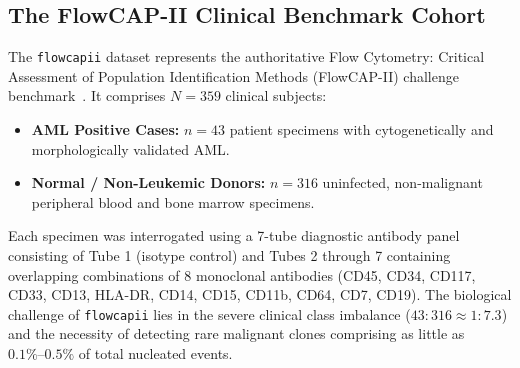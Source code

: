 \documentclass[10pt,journal,compsoc]{IEEEtran}
\begin{document}
\subsection{The FlowCAP-II Clinical Benchmark Cohort}
The \texttt{flowcapii} dataset represents the authoritative Flow Cytometry: Critical Assessment of Population Identification Methods (FlowCAP-II) challenge benchmark~\cite{aghaeepour2013critical}. It comprises $N=359$ clinical subjects:
\begin{itemize}
    \item \textbf{AML Positive Cases:} $n=43$ patient specimens with cytogenetically and morphologically validated AML.
    \item \textbf{Normal / Non-Leukemic Donors:} $n=316$ uninfected, non-malignant peripheral blood and bone marrow specimens.
\end{itemize}
Each specimen was interrogated using a 7-tube diagnostic antibody panel consisting of Tube 1 (isotype control) and Tubes 2 through 7 containing overlapping combinations of 8 monoclonal antibodies (CD45, CD34, CD117, CD33, CD13, HLA-DR, CD14, CD15, CD11b, CD64, CD7, CD19). The biological challenge of \texttt{flowcapii} lies in the severe clinical class imbalance ($43:316 \approx 1:7.3$) and the necessity of detecting rare malignant clones comprising as little as $0.1\%\text{--}0.5\%$ of total nucleated events.
\end{document}
